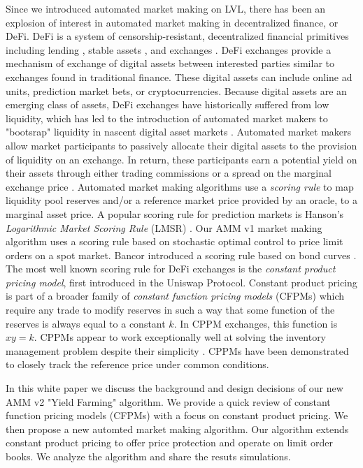 \documentclass{article}
\begin{document}
Since we introduced automated market making on LVL, there has been an explosion of interest in automated market making in decentralized finance, or DeFi. DeFi is a system of censorship-resistant, decentralized financial primitives including lending \cite{compound}, stable assets \cite{dai}, and exchanges \cite{uniswapv2}. DeFi exchanges provide a mechanism of exchange of digital assets between interested parties similar to exchanges found in traditional finance. These digital assets can include online ad units, prediction market bets, or cryptocurrencies. Because digital assets are an emerging class of assets, DeFi exchanges have historically suffered from low liquidity, which has led to the introduction of automated market makers to "bootsrap" liquidity in nascent digital asset markets \cite{practical}. Automated market makers allow market participants to passively allocate their digital assets to the provision of liquidity on an exchange. In return, these participants earn a potential yield on their assets through either trading commissions or a spread on the marginal exchange price \cite{yfintro}. Automated market making algorithms use a \emph{scoring rule} to map liquidity pool reserves and/or a reference market price provided by an oracle, to a marginal asset price. A popular scoring rule for prediction markets is Hanson's \emph{Logarithmic Market Scoring Rule} (LMSR) \cite{hanson}. Our AMM v1 market making algorithm uses a scoring rule based on stochastic optimal control to price limit orders on a spot market. Bancor introduced a scoring rule based on bond curves \cite{bancor}. The most well known scoring rule for DeFi exchanges is the \emph{constant product pricing model}, first introduced in the Uniswap Protocol. Constant product pricing is part of a broader family of \emph{constant function pricing models} (CFPMs) which require any trade to modify reserves in such a way that some function of the reserves is always equal to a constant $k$. In CPPM exchanges, this function is $xy = k$. CPPMs appear to work exceptionally well at solving the inventory management problem despite their simplicity \cite{stanford}. CPPMs have been demonstrated to closely track the reference price under common conditions.

In this white paper we discuss the background and design decisions of our new AMM v2 "Yield Farming" algorithm. We provide a quick review of constant function pricing models (CFPMs) with a focus on constant product pricing. We then propose a new automted market making algorithm. Our algorithm extends constant product pricing to offer price protection and operate on limit order books. We analyze the algorithm and share the resuts simulations.
\end{document}
